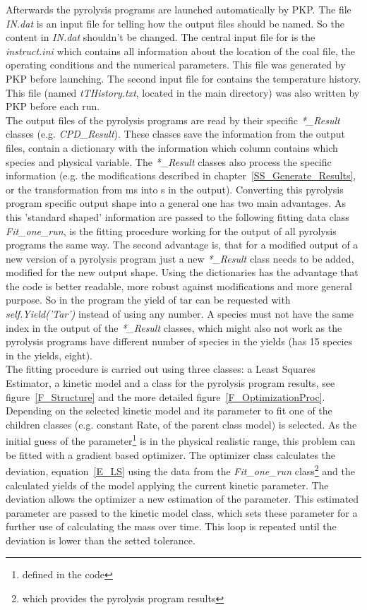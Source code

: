 Afterwards the pyrolysis programs are launched automatically by PKP. The file \emph{IN.dat} is an input file for \CPD telling how the output files should be named. So the content in \emph{IN.dat} shouldn't be changed. The central input file for \FGDVC is the \emph{instruct.ini} which contains all information about the location of the coal file, the operating conditions and the numerical parameters. This file was generated by PKP before launching. The second input file for \FGDVC contains the temperature history. This file (named \emph{tTHistory.txt}, located in the \FGDVC main directory) was also written by PKP before each run.\\
The output files of the pyrolysis programs are read by their specific \emph{*\_Result} classes (e.g. \emph{CPD\_Result}). These classes save the information from the output files, contain a dictionary with the information which column contains which species and physical variable. The  \emph{*\_Result} classes also process the specific information (e.g. the modifications described in chapter~\ref{SS_Generate_Results}, or the transformation from ms into s in the \CPD output). Converting this pyrolysis program specific output shape into a general one has two main advantages. As this 'standard shaped' information are passed to the following fitting data class \emph{Fit\_one\_run}, is the fitting procedure working for the output of all pyrolysis programs the same way. The second advantage is, that for a modified output of a new version of a pyrolysis program just a new \emph{*\_Result} class needs to be added, modified for the new output shape.
Using the dictionaries has the advantage that the code is better readable, more robust against modifications and more general purpose. So in the program the yield of tar can be requested with \emph{self.Yield('Tar')} instead of using any number. A species must not have the same index in the output of the \emph{*\_Result} classes, which might also not work as the pyrolysis programs have different number of species in the yields (\FGDVC has 15 species in the yields, \CPD eight).\\

The fitting procedure is carried out using three classes: a Least Squares Estimator, a kinetic model and a class for the pyrolysis program results, see figure~\ref{F_Structure} and the more detailed figure~\ref{F_OptimizationProc}. Depending on the selected kinetic model and its parameter to fit one of the children classes (e.g. constant Rate, of the parent class model) is selected. As the initial guess of the parameter\footnote{defined in the code} is in the physical realistic range, this problem can be fitted with a gradient based optimizer. The optimizer class calculates the deviation, equation~\ref{E_LS} using the data from the \emph{Fit\_one\_run} class\footnote{which provides the pyrolysis program results} and the calculated yields of the model applying the current kinetic parameter.
The deviation allows the optimizer a new estimation of the parameter. This estimated parameter are passed to the kinetic model class, which sets these parameter for a further use of calculating the mass over time. This loop is repeated until the deviation is lower than the setted tolerance.\\

